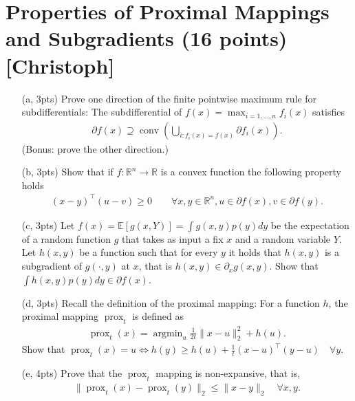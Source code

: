 \documentclass{article}
\theoremstyle{remark}
\theoremstyle{definition}
\newcommand{\argmin}{\mathop{\mathrm{argmin}}}
\newcommand{\reals}{\mathbb R}
\newcommand{\prox}{\operatorname{prox}}
\begin{document}
\section{Properties of Proximal Mappings and Subgradients (16 points) [Christoph]}
\begin{enumerate}
    \item[(a, 3pts)] Prove one direction of the finite pointwise maximum rule for subdifferentials: The subdifferential of $f(x) = \max_{i=1,\dots, n} f_i(x)$ satisfies
        \begin{align}
            \partial f(x) \supseteq \operatorname{conv}\left( \bigcup_{i : f_i(x) = f(x)} \partial f_i(x)  \right).
        \end{align}
        (Bonus: prove the other direction.)
    \item[(b, 3pts)] Show that if $f: \reals^n \rightarrow \reals$ is a convex function the following property holds
        \begin{align}
            (x-y)^\top (u - v) \geq 0 \qquad \forall x,y \in \reals^n, u \in \partial f(x), v \in \partial f(y). 
        \end{align}
    \item[(c, 3pts)] Let $f(x) = \mathbb E[g(x, Y)] = \int g(x, y) p(y) dy$ be the expectation of a
random function $g$ that takes as input a fix $x$ and a random variable $Y$.
Let $h(x, y)$ be a function such that for every $y$ it holds that $h(x, y)$ is
a subgradient of $g( \cdot, y)$ at $x$,  that is $h(x,y) \in \partial_x g(x,
y)$. Show that $\int h(x,y) p(y) dy \in \partial f(x)$.
    \item[(d, 3pts)] Recall the definition of the proximal mapping: For a function $h$, the proximal mapping $\prox_t$ is defined as
\begin{align}
    \prox_t(x) = \argmin_{u} \frac{1}{2t} \| x-u\|_2^2 + h(u).
\end{align}
 Show that $\prox_t(x) = u \Leftrightarrow h(y) \geq h(u) + \frac 1 t (x - u)^\top (y - u) \quad \forall y$.
    \item[(e, 4pts)] Prove that the $\prox_t$ mapping is non-expansive, that is, 
        \begin{align}
        \| \prox_t(x) - \prox_t(y) \|_2 \leq \| x - y\|_2 \quad \forall x, y.
        \end{align}

\end{enumerate}
\end{document}

